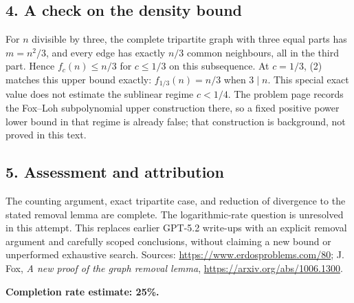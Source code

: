 \subsection*{4. A check on the density bound}
For $n$ divisible by three, the complete tripartite graph with three equal parts has $m=n^2/3$, and every edge has exactly $n/3$ common neighbours, all in the third part. Hence $f_c(n)\le n/3$ for $c\le1/3$ on this subsequence. At $c=1/3$, (2) matches this upper bound exactly: $f_{1/3}(n)=n/3$ when $3\mid n$.
This special exact value does not estimate the sublinear regime $c<1/4$. The problem page records the Fox--Loh subpolynomial upper construction there, so a fixed positive power lower bound in that regime is already false; that construction is background, not proved in this text.

\subsection*{5. Assessment and attribution}
The counting argument, exact tripartite case, and reduction of divergence to the stated removal lemma are complete. The logarithmic-rate question is unresolved in this attempt. This replaces earlier GPT-5.2 write-ups with an explicit removal argument and carefully scoped conclusions, without claiming a new bound or unperformed exhaustive search.
Sources: \url{https://www.erdosproblems.com/80}; J. Fox, \emph{A new proof of the graph removal lemma}, \url{https://arxiv.org/abs/1006.1300}.

\textbf{Completion rate estimate: 25\%.}
